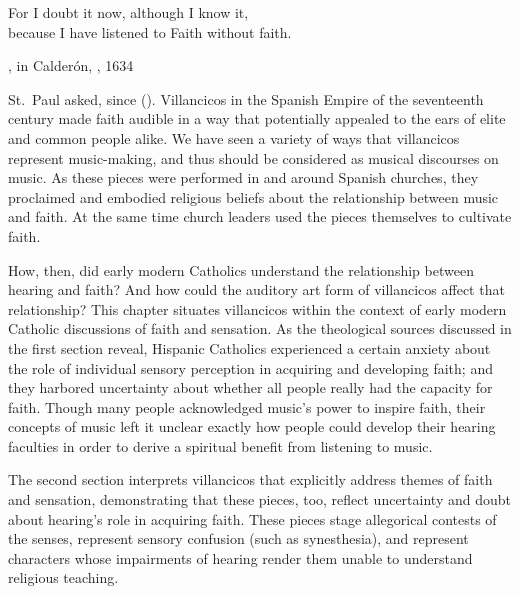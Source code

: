


\label{ch:faith-hearing}

\epigraph
{For I doubt it now, although I know it,\\
because I have listened to Faith without faith.}
{, in Calderón, , 1634}

 St.\ Paul asked, since  ().
Villancicos in the Spanish Empire of the seventeenth century made faith audible in a way that potentially appealed to the ears of elite and common people alike.
We have seen a variety of ways that villancicos represent music-making, and thus should be considered as musical discourses on music.
As these pieces were performed in and around Spanish churches, they proclaimed and embodied religious beliefs about the relationship between music and faith.
At the same time church leaders used the pieces themselves to cultivate faith.

How, then, did early modern Catholics understand the relationship between hearing and faith?
And how could the auditory art form of villancicos affect that relationship?
This chapter situates villancicos within the context of early modern Catholic discussions of faith and sensation.
As the theological sources discussed in the first section reveal, Hispanic Catholics experienced a certain anxiety about the role of individual sensory perception in acquiring and developing faith; and they harbored uncertainty about whether all people really had the capacity for faith.
Though many people acknowledged music's power to inspire faith, their concepts of music left it unclear exactly how people could develop their hearing faculties in order to derive a spiritual benefit from listening to music.

The second section interprets villancicos that explicitly address themes of faith and sensation, demonstrating that these pieces, too, reflect uncertainty and doubt about hearing's role in acquiring faith.
These pieces stage allegorical contests of the senses, represent sensory confusion (such as synesthesia), and represent characters whose impairments of hearing render them unable to understand religious teaching.

